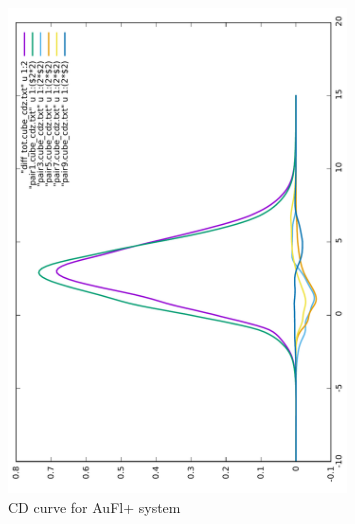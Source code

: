 \documentclass[journal=inoraj,manuscript=article]{achemso}
\begin{document}
\begin{figure}[!h]
\includegraphics[angle=-90,width=0.80\textwidth]{./AuFl+/cd.pdf}
\caption{CD curve for AuFl+ system}
\end{figure}
\end{document}
